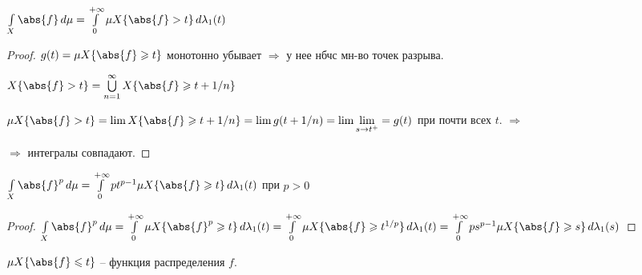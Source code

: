 \begin{consequence}
	$\int\limits_X \abs{f}\,d\mu = \int\limits_0^{+\infty}\mu X\{\abs{f} > t\}\,d\lambda_1(t)$
\end{consequence}

\begin{proof}\thmslashn
	
	$g(t) = \mu X\{\abs{f} \geqslant t\}$ монотонно убывает $\Rightarrow$ у нее нбчс мн-во точек разрыва.
	
	$X\{\abs{f} > t\} = \bigcup\limits_{n=1}^{\infty} X\{\abs{f} \geqslant t + 1/n\}$
	
	$\mu X\{\abs{f} > t\} = \lim X\{\abs{f} \geqslant t + 1/n\} = \lim g(t + 1/n) = \lim\lim\limits_{s\to t^+} = g(t)$ при почти всех $t$. $\Rightarrow$ 
	
	$\Rightarrow$ интегралы совпадают.
	
\end{proof}


\begin{consequence}
	$\int\limits_X \abs{f}^p\,d\mu = \int\limits_0^{+\infty}pt^{p-1}\mu X\{\abs{f} \geqslant t\}\,d\lambda_1(t)$ при $p>0$
\end{consequence}

\begin{proof}\thmslashn
	
	$\int\limits_X \abs{f}^p\,d\mu = \int\limits_0^{+\infty}\mu X\{\abs{f}^p \geqslant t\}\,d\lambda_1(t) = \int\limits_0^{+\infty}\mu X\{\abs{f} \geqslant t^{1/p}\}\,d\lambda_1(t) = \int\limits_0^{+\infty}ps^{p-1} \mu X\{\abs{f} \geqslant s\}\,d\lambda_1(s)$
	
\end{proof}

\begin{remark}
	$\mu X\{\abs{f} \leqslant t\}$ -- функция распределения $f$.
\end{remark}